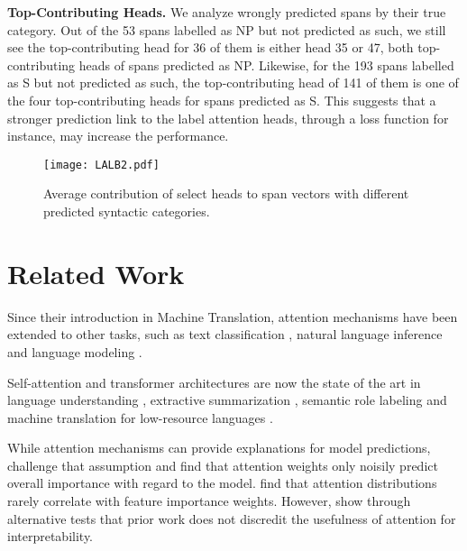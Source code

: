 \documentclass[11pt,a4paper]{article}
\begin{document}
{\bf Top-Contributing Heads. } We analyze wrongly predicted spans by their true category. Out of the 53 spans labelled as NP but not predicted as such, we still see the top-contributing head for 36 of them is either head 35 or 47, both top-contributing heads of spans predicted as NP. Likewise, for the 193 spans labelled as S but not predicted as such, the top-contributing head of 141 of them is one of the four top-contributing heads for spans predicted as S. This suggests that a stronger prediction link to the label attention heads, through a loss function for instance, may increase the performance.

\begin{figure}
    \centering
    \texttt{[image: LALB2.pdf]}
    \caption{Average contribution of select heads to span vectors with different predicted syntactic categories.}\label{lalb}
\end{figure}

\section{Related Work}
\label{section_rel}

Since their introduction in Machine Translation, attention mechanisms \cite{bahdanau2014neural, luong2015effective} have been extended to other tasks, such as text classification \cite{yang2016hierarchical}, natural language inference \cite{chen2016enhancing} and language modeling \cite{salton2017attentive}.

Self-attention and transformer architectures \cite{vaswani2017attention} are now the state of the art in language understanding \cite{devlin2018bert, yang2019xlnet}, extractive summarization \cite{DBLP:journals/corr/abs-1903-10318}, semantic role labeling \cite{strubell2018linguistically} and machine translation for low-resource languages \cite{rikters2018impact, rikters2018training}.



While attention mechanisms can provide explanations for model predictions, \citet{serrano2019attention} challenge that assumption and find that attention weights only noisily predict overall importance with regard to the model. \citet{jain2019attention} find that attention distributions rarely correlate with feature importance weights. However, \citet{wiegreffe2019attention} show through alternative tests that prior work does not discredit the usefulness of attention for interpretability.
\end{document}
